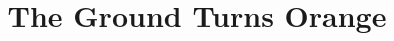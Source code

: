 \documentclass[11pt]{article}
\begin{document}
\ttfamily
\title{The Ground Turns Orange}
\maketitle
\end{document}
